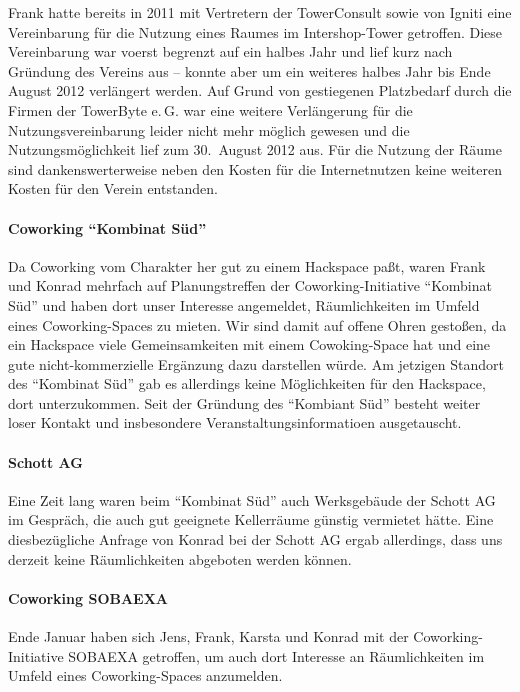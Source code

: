 \documentclass[10pt,DIV16]{scrartcl}
\begin{document}
Frank hatte bereits in 2011 mit Vertretern der TowerConsult sowie 
von Igniti eine Vereinbarung für die Nutzung eines Raumes im 
Intershop-Tower getroffen. Diese Vereinbarung war voerst begrenzt 
auf ein halbes Jahr und lief kurz nach Gründung des Vereins aus -- 
konnte aber um ein weiteres halbes Jahr bis Ende August 2012 
verlängert werden. Auf Grund von gestiegenen Platzbedarf durch die 
Firmen der TowerByte e.\,G. war eine weitere Verlängerung für die 
Nutzungsvereinbarung leider nicht mehr möglich gewesen und die 
Nutzungsmöglichkeit lief zum 30.~August 2012 aus. Für die Nutzung 
der Räume sind dankenswerterweise neben den Kosten für die 
Internetnutzen keine weiteren Kosten für den Verein entstanden. 

\paragraph{Coworking ``Kombinat Süd''}

Da Coworking vom Charakter her gut zu einem Hackspace paßt, waren 
Frank und Konrad mehrfach auf Planungstreffen der 
Coworking-Initiative "`Kombinat Süd"' und haben dort unser Interesse 
angemeldet, Räumlichkeiten im Umfeld eines Coworking-Spaces zu 
mieten.  Wir sind damit auf offene Ohren gestoßen, da ein Hackspace 
viele Gemeinsamkeiten mit einem Cowoking-Space hat und eine gute 
nicht-kommerzielle Ergänzung dazu darstellen würde.  Am jetzigen 
Standort des "`Kombinat Süd"' gab es allerdings keine Möglichkeiten 
für den Hackspace, dort unterzukommen. Seit der Gründung des 
"`Kombiant Süd"' besteht weiter loser Kontakt und insbesondere 
Veranstaltungsinformatioen ausgetauscht. 

\paragraph{Schott AG}

Eine Zeit lang waren beim "`Kombinat Süd"' auch Werksgebäude der Schott AG im
Gespräch, die auch gut geeignete Kellerräume günstig vermietet hätte.  Eine
diesbezügliche Anfrage von Konrad bei der Schott AG ergab allerdings, dass uns
derzeit keine Räumlichkeiten abgeboten werden können.

\paragraph{Coworking SOBAEXA}

Ende Januar haben sich Jens, Frank, Karsta und Konrad mit der 
Coworking-Initiative SOBAEXA getroffen, um auch dort Interesse an 
Räumlichkeiten im Umfeld eines Coworking-Spaces anzumelden.
\end{document}
